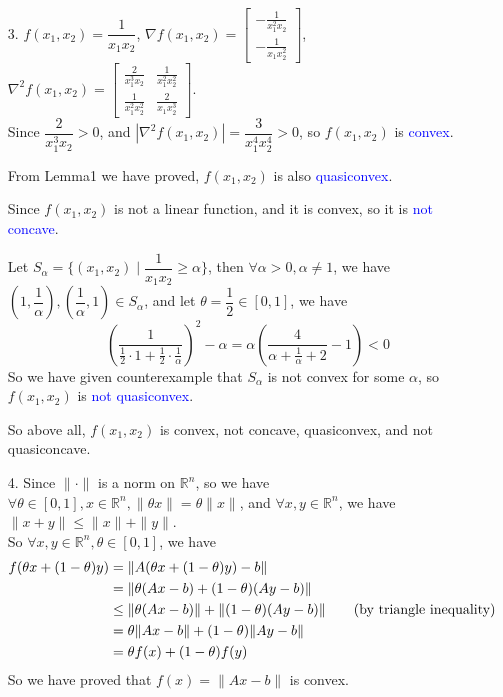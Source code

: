 \begin{itemize}
\item[3.] $f(x_1,x_2)=\dfrac{1}{x_1x_2}$, $\nabla f(x_1,x_2)=\begin{bmatrix}-\frac{1}{x_1^2x_2} \\ -\frac{1}{x_1x_2^2}\end{bmatrix}$, $\nabla^2 f(x_1,x_2)=\begin{bmatrix}\frac{2}{x_1^3x_2} & \frac{1}{x_1^2x_2^2} \\ \frac{1}{x_1^2x_2^2} & \frac{2}{x_1x_2^3}\end{bmatrix}$. \\
Since $\dfrac{2}{x_1^3x_2}>0$, and $\left|\nabla^2 f(x_1,x_2)\right|=\dfrac{3}{x_1^4x_2^4}>0$, so $f(x_1,x_2)$ is \textcolor{blue}{convex}.

From Lemma1 we have proved, $f(x_1,x_2)$ is also \textcolor{blue}{quasiconvex}.

Since $f(x_1,x_2)$ is not a linear function, and it is convex, so it is \textcolor{blue}{not concave}.

Let $S_{\alpha}= \{(x_1,x_2)\mid \dfrac{1}{x_1x_2}\geq \alpha\}$, then $\forall \alpha>0,\alpha\neq 1$, we have $\left(1,\dfrac{1}{\alpha}\right),\left(\dfrac{1}{\alpha},1\right)\in S_{\alpha}$, and let $\theta=\dfrac{1}{2}\in[0,1]$, we have
$$\left(\dfrac{1}{\frac{1}{2}\cdot 1 + \frac{1}{2}\cdot \frac{1}{\alpha}}\right)^2 - \alpha = \alpha\left(\dfrac{4}{\alpha+\frac{1}{\alpha}+2}-1\right) < 0$$
So we have given counterexample that $S_{\alpha}$ is not convex for some $\alpha$, so $f(x_1,x_2)$ is \textcolor{blue}{not quasiconvex}.

So above all, $f(x_1,x_2)$ is convex, not concave, quasiconvex, and not quasiconcave.


\item[4.] Since $\|\cdot\|$ is a norm on $\mathbb{R}^n$, so we have $\forall\theta\in[0,1],x\in\mathbb{R}^n, \|\theta x\|=\theta\|x\|$, and $\forall x,y\in\mathbb{R}^n$, we have $\|x+y\|\leq\|x\|+\|y\|$. \\
So $\forall x,y\in\mathbb{R}^n, \theta\in[0,1]$, we have
\begin{align*}
f(\theta x + (1-\theta)y) &= \|A(\theta x + (1-\theta)y) - b\| \\
&= \|\theta(Ax-b)+(1-\theta)(Ay-b)\| \\
&\leq \|\theta(Ax-b)\| + \|(1-\theta)(Ay-b)\| \text{\quad\quad (by triangle inequality)} \\
&= \theta\|Ax-b\| + (1-\theta)\|Ay-b\| \\
&= \theta f(x) + (1-\theta)f(y)
\end{align*}
So we have proved that $f(x)=\|Ax-b\|$ is convex.



\end{itemize}
